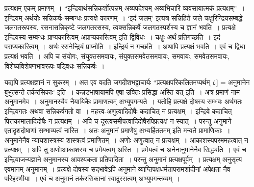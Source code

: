 {प्रत्यक्षम् एकम् प्रमाणम्~। “इन्द्रियार्थसन्निकर्शोत्पन्नम् अव्यपदेश्यम् अव्यभिचारि व्यवसायात्मकं प्रत्यक्षम्”~। इन्द्रियम् अर्थयोः सन्निकर्षः-सम्बन्धः प्रत्यक्षे कारणम्~। ‘इदं जलम्’ इत्यत्र सन्निहिते जले चक्षुरिन्द्रियसम्बद्धे जलगतरूपस्य, रसनासन्निकृष्टे जलगतरसस्य, त्वक्सन्निकर्षे जलगतस्पर्शस्य च ज्ञानं भवति~। प्रत्यक्षे इन्द्रियस्य सम्बन्धः प्राप्यकारित्वम् अप्राप्यकारित्वम् इति द्विविधः~। चक्षुः अर्थं प्रतिगच्छति~। इदं पराप्यकारित्वम्~। अर्थः रसनेन्द्रियं प्राप्नोति~। इन्द्रियं न गच्छति~। अथापि प्रत्यक्षं भवति~। एवं च द्विधा प्रत्यक्षं भवति~। अपि च संयोगः, संयुक्तसमवायः, संयुक्तसमवेतसमवायः, समवायः, समवेतसमवायः, विशेष्यविशेषणभावरूपः षड्विधः सन्निकर्षः~। 

यद्यपि प्रत्यक्षज्ञानं न सुकरम्~। अत एव वदति जगदीशभट्टाचार्यः “प्रत्यक्षपरिकलितमप्यर्थम् ८] = अनुमानेन बुभुत्सन्ते तर्करसिकाः’ इति~। कन्नडभाषायामपि एषा उक्तिः प्रसिद्धा अस्ति यत् {\fontsize{14}{16}\selectfont {}} इति~। अत्र प्रमाणं नाम अनुमानमेव~। अनुमानस्यैव नैयायिकैः प्रामाणत्वम् अभ्युपगम्यते~। यतोहि प्रत्यक्षे दोषस्य सम्भवः अर्थगतः इन्द्रियगतः अथवा सन्निकर्षगतो वा~। महत्त्व-अणुत्वादिदोषैः कदाचित् न प्रत्यक्षम्~। इन्द्रिये कदाचित् पित्तकामालादिदोषैः न प्रत्यक्षम्~। अपि च दूरत्वसमीपत्वादिदोषैरपिप्रत्यक्षं न स्यात्~। परन्तु अनुमाने एतादृशदोषाणां सम्भाव्यत्वं नास्ति~। अतः अनुमानं प्रमाणेषु अभ्यर्हिततमम् इति मन्वते प्रामाणिकाः~। अनुमानेनैव न्यायशास्त्रस्य शास्त्रत्वं प्रमाणितम्~। अणोः अणुत्वात् न प्रत्यक्षम्~। आकाशस्यपरममहत्वात् न प्रत्यक्षम्~। अपि तु अणोःआकाशस्य च प्रमेयत्वम् अस्ति~। प्रमेयत्वं च अनेनानुमानेनैव सिद्ध्यति~। एवं च इन्द्रियाजन्यज्ञाने अनुमानस्य आवश्यकता प्रतिपादिता~। परन्तु अनुमानं प्रत्यक्षपूर्वम्~। प्रत्यक्षम् अनुसृत्य एवमानम् अनुमानम्~। प्रत्यक्षे दोषस्य सद्भावेऽपि अनुमाने व्याप्तिपक्षधर्मतापरामर्शादीनां अपेक्षता नैव परिहरणीया~। एवं च अनुमानं तर्करसिकानां स्वादुरसत्वम् अभ्युपगन्तव्यम्~। 

\articleend
}
